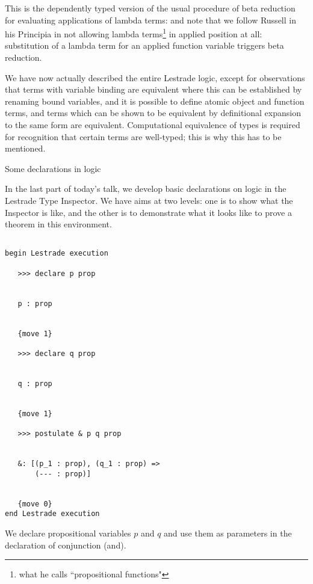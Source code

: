 \documentclass{slides}
\begin{document}
\begin{slide}

 This is the dependently typed version of the usual procedure of beta reduction for evaluating applications of lambda terms:  and note that we follow Russell in his Principia in not allowing lambda terms\footnote{what he calls ``propositional functions"} in applied position at all:  substitution of a lambda term for an applied function variable triggers beta reduction.

We have now actually described the entire Lestrade logic, except for observations that terms with variable binding are equivalent where this can be established by renaming bound variables, and it is possible to define atomic object and function terms, and terms which can be shown to be equivalent by definitional expansion to the same form are equivalent.  Computational equivalence of types is required for recognition that certain terms are well-typed;  this is why this has to be mentioned.

\end{slide}

\begin{slide}

{\Large Some declarations in logic}

In the last part of today's talk, we develop basic declarations on logic in the Lestrade Type Inspector.  We have aims at two levels:  one is to show what the Inspector is like, and the other is to demonstrate what it looks like to prove a theorem in this environment.

{\tiny

\begin{verbatim}

begin Lestrade execution

   >>> declare p prop


   p : prop


   {move 1}

   >>> declare q prop


   q : prop


   {move 1}

   >>> postulate & p q prop


   &: [(p_1 : prop), (q_1 : prop) => 
       (--- : prop)]


   {move 0}
end Lestrade execution

\end{verbatim}

}

We declare propositional variables $p$ and $q$ and use them as parameters in the declaration  of conjunction (and).

\end{slide}
\end{document}
